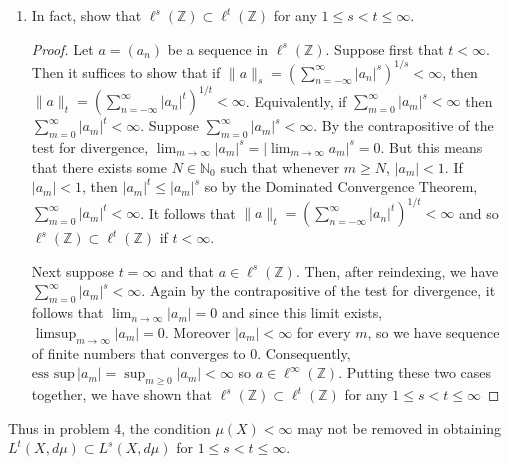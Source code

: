 \documentclass[11pt,oneside,english]{amsart}
\theoremstyle{definition}
\newcommand{\lom}[2]{\lim_{{#1}\rightarrow{#2}}}
\newcommand{\MB}[1]{\mathbb{#1}}
\begin{document}
\begin{enumerate}
\begin{enumerate}
\begin{proof}
As a counterexample, consider the harmonic sequence $h(n)=\left(1,\frac{1}{2},\frac{1}{3},\frac{1}{4},\ldots\right)$ which can be equivalently indexed by the integers or the positive integers and realized as a two-sided infinite sequence. Then $h\in\ell^2(\MB{Z})$ since
\[
\|h\|_{\ell^2}=\left(\sum_{n=-\infty}^\infty\left|\frac{1}{n}\right|^2\right)^{1/2}=\left(\sum_{m=1}^\infty\frac{1}{m^2}\right)^{1/2}=\frac{\pi}{\sqrt{6}}<\infty.
\]
However, $h\not\in\ell^1(\MB{Z})$ since the harmonic series diverges. Consequently, $\ell^2(\MB{Z})\not\subset\ell^1(\MB{Z})$ and so in general $L^2(X,d\mu)\not\subset L^1(X,d\mu)$.
\end{proof}

\item In fact, show that $\ell^s(\MB{Z})\subset \ell^t(\MB{Z})$ for any $1\leq s<t\leq \infty$.

\begin{proof}
Let $a=(a_n)$ be a sequence in $\ell^{s}(\MB{Z})$. Suppose first that $t<\infty$. Then it suffices to show that if $\|a\|_s=\left(\sum_{n=-\infty}^\infty|a_n|^s\right)^{1/s}<\infty$, then $\|a\|_t=\left(\sum_{n=-\infty}^\infty|a_n|^t\right)^{1/t}<\infty$. Equivalently, if $\sum_{m=0}^\infty|a_m|^s<\infty$ then $\sum_{m=0}^\infty|a_m|^t<\infty$. Suppose $\sum_{m=0}^\infty|a_m|^s<\infty$. By the contrapositive of the test for divergence, $\lom{m}{\infty}|a_m|^s=\left|\lom{m}{\infty}a_m\right|^s=0$. But this means that there exists some $N\in\MB{N}_0$ such that whenever $m\geq N$, $|a_m|<1$. If $|a_m|<1$, then $|a_m|^t\leq |a_m|^s$ so by the Dominated Convergence Theorem, $\sum_{m=0}^\infty |a_m|^t<\infty$. It follows that $\|a\|_t=\left(\sum_{n=-\infty}^\infty |a_n|^t\right)^{1/t}<\infty$ and so $\ell^s(\MB{Z})\subset \ell^t(\MB{Z})$ if $t<\infty$.

Next suppose $t=\infty$ and that $a\in\ell^s(\MB{Z})$. Then, after reindexing, we have $\sum_{m=0}^\infty|a_m|^s<\infty$. Again by the contrapositive of the test for divergence, it follows that $\lom{n}{\infty}|a_m|=0$ and since this limit exists, $\limsup_{m\to\infty}|a_m|=0$. Moreover $|a_m|<\infty$ for every $m$, so we have  sequence of finite numbers that converges to 0. Consequently, $\text{ess sup}\,|a_m|=\sup_{m\geq0}|a_m|<\infty$ so $a\in\ell^\infty(\MB{Z})$. Putting these two cases together, we have shown that $\ell^s(\MB{Z})\subset \ell^t(\MB{Z})$ for any $1\leq s<t\leq \infty$
\end{proof}

\end{enumerate}

Thus in problem 4, the condition $\mu(X)<\infty$ may not be removed in obtaining $L^t(X,d\mu)\subset L^s(X,d\mu)$ for $1\leq s<t\leq \infty$.
	
	
\end{enumerate}
\end{document}
